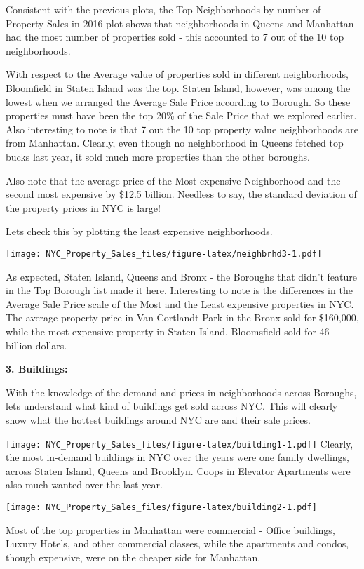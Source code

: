 \documentclass[
  a3paper,
]{article}
\begin{document}
Consistent with the previous plots, the Top Neighborhoods by number of
Property Sales in 2016 plot shows that neighborhoods in Queens and
Manhattan had the most number of properties sold - this accounted to 7
out of the 10 top neighborhoods.

With respect to the Average value of properties sold in different
neighborhoods, Bloomfield in Staten Island was the top. Staten Island,
however, was among the lowest when we arranged the Average Sale Price
according to Borough. So these properties must have been the top 20\% of
the Sale Price that we explored earlier. Also interesting to note is
that 7 out the 10 top property value neighborhoods are from Manhattan.
Clearly, even though no neighborhood in Queens fetched top bucks last
year, it sold much more properties than the other boroughs.

Also note that the average price of the Most expensive Neighborhood and
the second most expensive by \$12.5 billion. Needless to say, the
standard deviation of the property prices in NYC is large!

Lets check this by plotting the least expensive neighborhoods.

\texttt{[image: NYC\_Property\_Sales\_files/figure-latex/neighbrhd3-1.pdf]}

As expected, Staten Island, Queens and Bronx - the Boroughs that didn't
feature in the Top Borough list made it here. Interesting to note is the
differences in the Average Sale Price scale of the Most and the Least
expensive properties in NYC. The average property price in Van Cortlandt
Park in the Bronx sold for \$160,000, while the most expensive property
in Staten Island, Bloomsfield sold for 46 billion dollars.\\
\newpage

\textbf{3. Buildings:}

With the knowledge of the demand and prices in neighborhoods across
Boroughs, lets understand what kind of buildings get sold across NYC.
This will clearly show what the hottest buildings around NYC are and
their sale prices.

\texttt{[image: NYC\_Property\_Sales\_files/figure-latex/building1-1.pdf]}
Clearly, the most in-demand buildings in NYC over the years were one
family dwellings, across Staten Island, Queens and Brooklyn. Coops in
Elevator Apartments were also much wanted over the last year.

\texttt{[image: NYC\_Property\_Sales\_files/figure-latex/building2-1.pdf]}

Most of the top properties in Manhattan were commercial - Office
buildings, Luxury Hotels, and other commercial classes, while the
apartments and condos, though expensive, were on the cheaper side for
Manhattan.
\end{document}
